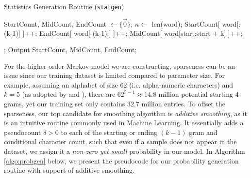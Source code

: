\documentclass{article} %
\theoremstyle{definition}
\theoremstyle{theorem}
\theoremstyle{remark}
\theoremstyle{remark}
\begin{document}
\begin{algorithm}[!htbp]
\renewcommand\footnoterule{}
    \caption{Statistics Generation Routine (\texttt{statgen})}
    \label{algo:statgen}
    \begin{algorithmic}
        
        \State
        \State StartCount, MidCount, EndCount $\gets \{\vec{0}\}$;       
        \State
            \State $n \gets $ len(word);
            \State StartCount[ word[:(k-1)] ]++;
            \State EndCount[ word[-(k-1):] ]++;
                \State MidCount[ word[start:start + k] ]++;
            \EndFor
            \State \Return
        \EndFunction
        
        \State
            \State {};
        \EndFor
        \State Output StartCount, MidCount, EndCount;
    \end{algorithmic}    
\end{algorithm}

\par\quad For the higher-order Markov model we are constructing, sparseness can be an issue since our training dataset is limited compared to parameter size. For example, assuming an alphabet of size $62$ (i.e. alpha-numeric characters) and $k=5$ (as adopted by \cite{omen} and \cite{probabilistic}), there are $62^{5-1} \approx 14.8$ million potential starting $4$-grams, yet our training set only contains $32.7$ million entries. To offset the sparseness, our top candidate for smoothing algorithm is \emph{additive smoothing}, as it is an intuitive routine commonly used in Machine Learning. It essentially adds a pseudocount $\delta>0$ to each of the starting or ending $(k-1)$ gram and conditional character count, such that even if a sample does not appear in the dataset, we assign it a \emph{non-zero yet small} probability in our model. In Algorithm \ref{algo:probgen} below, we present the pseudocode for our probability generation routine with support of additive smoothing.
\end{document}
